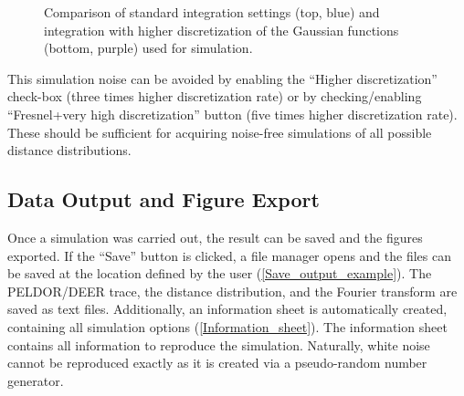 \documentclass[pdftex,bezier,german,a4,twoside, headexclude,12pt,nochapterprefix, titlepage]{extarticle}
\begin{document}
\begin{figure}[!htb]
    \caption{Comparison of standard integration settings (top, blue) and integration with higher discretization of the Gaussian
    functions (bottom, purple) used for simulation.
    }
\label{Integration_methods_comparison}
\end{figure} 

This simulation noise can be avoided by enabling the ``Higher discretization'' check-box (three times higher discretization rate) or by checking/enabling ``Fresnel+very high discretization'' button (five times higher discretization rate). These should be sufficient for acquiring noise-free simulations of all possible distance distributions.

\newpage

\subsection{Data Output and Figure Export}

Once a simulation was carried out, the result can be saved and the figures exported. If the ``Save'' button is clicked, a file manager opens and the files can be saved at the  location defined by the user (\autoref{Save_output_example}). The PELDOR/DEER trace, the distance distribution, and the Fourier transform are saved as text files. Additionally, an information sheet is automatically created, containing all simulation options (\autoref{Information_sheet}). The information sheet contains all information to reproduce the simulation. Naturally, white noise cannot be reproduced exactly as it is created via a pseudo-random number generator. 
\end{document}
